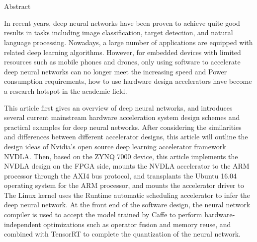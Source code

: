 \chapter[Abstract]{\MyTitleEn}

\begin{center}
\vspace{-0.3cm}
 \songti Abstract
\vspace{0.3cm}
\end{center}

In recent years, deep neural networks have been proven to achieve quite good results in tasks including image classification, target detection, and natural language processing. Nowadays, a large number of applications are equipped with related deep learning algorithms. However, for embedded devices with limited resources such as mobile phones and drones, only using software to accelerate deep neural networks can no longer meet the increasing speed and Power consumption requirements, how to use hardware design accelerators have become a research hotspot in the academic field.

This article first gives an overview of deep neural networks, and introduces several current mainstream hardware acceleration system design schemes and practical examples for deep neural networks. After considering the similarities and differences between different accelerator designs, this article will outline the design ideas of Nvidia's open source deep learning accelerator framework NVDLA. Then, based on the ZYNQ 7000 device, this article implements the NVDLA design on the FPGA side, mounts the NVDLA accelerator to the ARM processor through the AXI4 bus protocol, and transplants the Ubuntu 16.04 operating system for the ARM processor, and mounts the accelerator driver to The Linux kernel uses the Runtime automatic scheduling accelerator to infer the deep neural network. At the front end of the software design, the neural network compiler is used to accept the model trained by Caffe to perform hardware-independent optimizations such as operator fusion and memory reuse, and combined with TensorRT to complete the quantization of the neural network.

